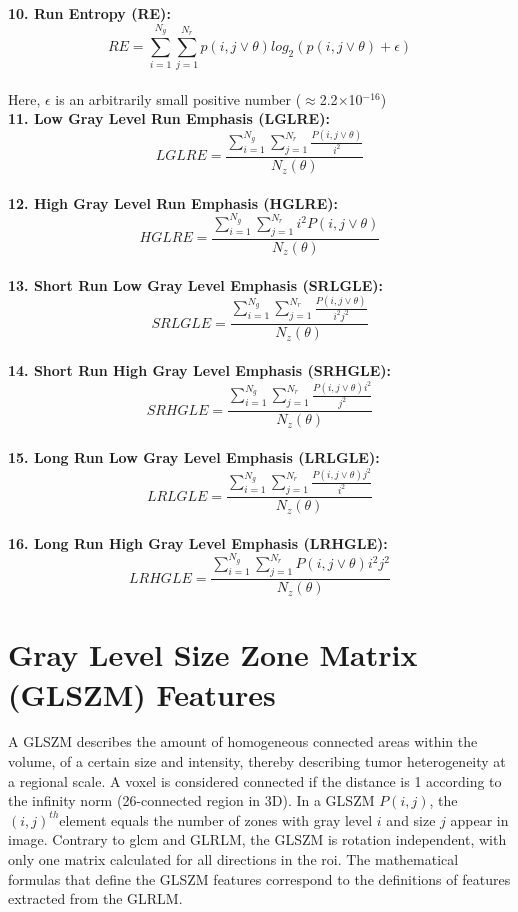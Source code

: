 \textbf{10. Run Entropy (RE):}\\
\[RE =\sum _{i=1}^{N_{g}}\sum _{j=1}^{N_{r}}p\left(i,j\vee \theta \right)log_{2}\left(p\left(i,j\vee \theta \right)+\epsilon \right)\]\\
Here, $\epsilon $ is an arbitrarily small positive number (${\approx}$2.2${\times}$10$^{-16}$)\\
\textbf{11. Low Gray Level Run Emphasis (LGLRE):}\\
\[\textit{LGLRE}=\frac{\sum _{i=1}^{N_{g}}\sum _{j=1}^{N_{r}}\frac{P\left(i,j\vee \theta \right)}{i^{2}}}{N_{z}\left(\theta \right)}\]\\
\textbf{12. High Gray Level Run Emphasis (HGLRE):}\\
\[\textit{HGLRE}=\frac{\sum _{i=1}^{N_{g}}\sum _{j=1}^{N_{r}}i^{2}P\left(i,j\vee \theta \right)}{N_{z}\left(\theta \right)}\]\\
\textbf{13. Short Run Low Gray Level Emphasis (SRLGLE):}\\
\[\textit{SRLGLE}=\frac{\sum _{i=1}^{N_{g}}\sum _{j=1}^{N_{r}}\frac{P\left(i,j\vee \theta \right)}{i^{2}j^{2}}}{N_{z}\left(\theta \right)}\]\\
\textbf{14. Short Run High Gray Level Emphasis (SRHGLE):}\\
\[\textit{SRHGLE}=\frac{\sum _{i=1}^{N_{g}}\sum _{j=1}^{N_{r}}\frac{P\left(i,j\vee \theta \right)i^{2}}{j^{2}}}{N_{z}\left(\theta \right)}\]\\
\textbf{15. Long Run Low Gray Level Emphasis (LRLGLE):}\\
\[\textit{LRLGLE}=\frac{\sum _{i=1}^{N_{g}}\sum _{j=1}^{N_{r}}\frac{P\left(i,j\vee \theta \right)j^{2}}{i^{2}}}{N_{z}\left(\theta \right)}\]\\
\textbf{16. Long Run High Gray Level Emphasis (LRHGLE):}\\
\[\textit{LRHGLE}=\frac{\sum _{i=1}^{N_{g}}\sum _{j=1}^{N_{r}}P\left(i,j\vee \theta \right)i^{2}j^{2}}{N_{z}\left(\theta \right)}\]

\section{Gray Level Size Zone Matrix (GLSZM) Features}

A GLSZM describes the amount of homogeneous connected areas within the volume, of a certain size and intensity, thereby describing tumor heterogeneity at a regional scale. A voxel is considered connected if the distance is 1 according to the infinity norm (26-connected region in 3D). In a GLSZM $P\left(i,j\right)$, the $\left(i,j\right)^{th}$element equals the number of zones with gray level $i$ and size $j$ appear in image. Contrary to \ac{glcm} and GLRLM, the GLSZM is rotation independent, with only one matrix calculated for all directions in the \ac{roi}. The mathematical formulas that define the GLSZM features correspond to the definitions of features extracted from the GLRLM.

